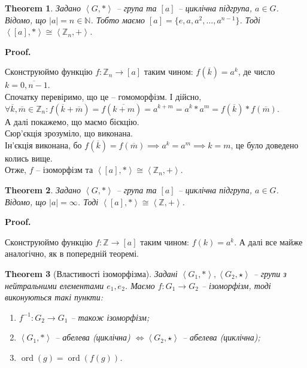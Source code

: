 \documentclass[a4paper, 10pt]{article}
\makeatletter
\theoremstyle{theoremdd}
\newtheorem{theorem}{Theorem}[subsection]
\theoremstyle{theoremdd}
\theoremstyle{theoremdd}
\theoremstyle{theoremdd}
\theoremstyle{theoremdd}
\theoremstyle{theoremdd}
\theoremstyle{theoremdd}
\theoremstyle{theoremdd}
\theoremstyle{theoremdd}
\theoremstyle{theoremdd}
\theoremstyle{theoremdd}
\theoremstyle{theoremdd}
\theoremstyle{theoremdd}
\theoremstyle{theoremdd}
\theoremstyle{theoremdd}
\renewenvironment{proof}[1][Proof.\\]{\par
\pushQED{\hfill \qed}%
\normalfont \topsep6\p@\@plus6\p@\relax
\trivlist
\item\relax
{\bfseries
#1\@addpunct{.}}\hspace\labelsep\ignorespaces
}{%
\popQED\endtrivlist\@endpefalse
}
\DeclareMathOperator{\ord}{ord}
\makeatother
\begin{document}
\begin{theorem}
Задано $\left<G,* \right>$ -- група та $[a]$ -- циклічна підгрупа, $a \in G$. Відомо, що $|a| = n \in \mathbb{N}$. Тобто маємо $[a] = \{e,a,a^2,\dots,a^{n-1}\}$. Тоді $\left<[a], *\right> \cong \left< \mathbb{Z}_n, + \right>$.
\end{theorem}

\begin{proof}
Сконструюймо функцію $f \colon \mathbb{Z}_n \to [a]$ таким чином: $f(\overline{k}) = a^k$, де число $k = \overline{0,n-1}$.\\
Спочатку перевіримо, що це -- гомоморфізм. І дійсно,\\
$\forall \overline{k}, \overline{m} \in \mathbb{Z}_n: f(\overline{k}+\overline{m}) = f(\overline{k+m}) = a^{k+m} = a^k * a^m = f(\overline{k})*f(\overline{m})$.\\
А далі покажемо, що маємо бієкцію.\\
Сюр'єкція зрозуміло, що виконана.\\
Ін'єкція виконана, бо $f(\overline{k}) = f(\overline{m}) \implies a^k = a^m \implies k = m$, це було доведено колись вище.\\
Отже, $f$ -- ізоморфізм та $\left<[a], *\right> \cong \left< \mathbb{Z}_n, + \right>$.
\end{proof}

\begin{theorem}
Задано $\left<G,* \right>$ -- група та $[a]$ -- циклічна підгрупа, $a \in G$. Відомо, що $|a| = \infty$. Тоді $\left<[a], *\right> \cong \left< \mathbb{Z}, + \right>$.
\end{theorem}

\begin{proof}
Сконструюймо функцію $f \colon \mathbb{Z} \to [a]$ таким чином: $f(k) = a^k$. А далі все майже аналогічно, як в попередній теоремі.
\end{proof}

\begin{theorem}[Властивості ізоморфізма]
Задані $\left<G_1, *\right>, \left<G_2, \star \right>$ -- групи з нейтральними елементами $e_1,e_2$. Маємо $f \colon G_1 \to G_2$ -- ізоморфізм, тоді виконуються такі пункти:
\begin{enumerate}[nosep,wide=0pt,label={\arabic*)}]
\item $f^{-1} \colon G_2 \to G_1$ -- також ізоморфізм;
\item $\left< G_1, * \right>$ -- абелева (циклічна) $\iff \left< G_2, \star \right>$ -- абелева (циклічна);
\item $\ord(g) = \ord(f(g))$.
\end{enumerate}
\end{theorem}
\end{document}
